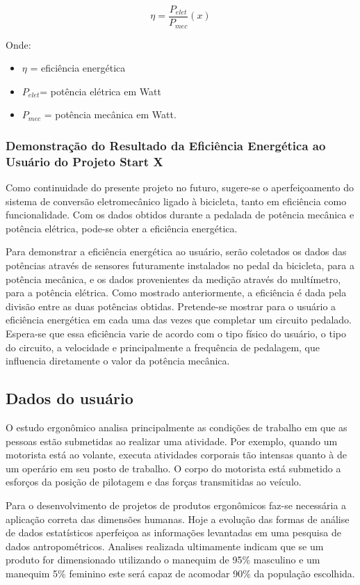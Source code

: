\begin{equation}
\eta =\frac{P_{elet}}{P_{mec}}\left ( x \right )
\label{eficiencia-energetica}
\end{equation}

Onde: 

\begin{itemize}

  \item $\eta$ = eficiência energética
  \item $P_{elet}$= potência elétrica em Watt
  \item $P_{mec} $ = potência mecânica em Watt.
\end{itemize}

\subsubsection{Demonstração do Resultado da Eficiência Energética ao Usuário do Projeto Start X}

Como continuidade do presente projeto no futuro, sugere-se o aperfeiçoamento do sistema de conversão eletromecânico ligado à bicicleta, tanto em eficiência como funcionalidade. Com os dados obtidos durante a pedalada de potência mecânica e potência elétrica, pode-se obter a eficiência energética. 

Para demonstrar a eficiência energética ao usuário, serão coletados os dados das potências através de sensores futuramente instalados no pedal da bicicleta, para a potência mecânica, e os dados provenientes da medição através do multímetro, para a potência elétrica. Como mostrado anteriormente, a eficiência é dada pela divisão entre as duas potências obtidas. Pretende-se mostrar para o usuário a eficiência energética em cada uma das vezes que completar um circuito pedalado. Espera-se que essa eficiência varie de acordo com o tipo físico do usuário, o tipo do circuito, a velocidade e principalmente a frequência de pedalagem, que influencia diretamente o valor da potência mecânica.

\subsection{Dados do usuário}

O estudo ergonômico analisa principalmente as condições de trabalho em que as pessoas estão submetidas ao realizar uma atividade. Por exemplo, quando um motorista está ao volante, executa atividades corporais tão intensas quanto à de um operário em seu posto de trabalho. O corpo do motorista está submetido a esforços da posição de pilotagem e das forças transmitidas ao veículo. 

Para o desenvolvimento de projetos de produtos ergonômicos faz-se necessária a aplicação correta das dimensões humanas. Hoje a evolução das formas de análise de dados estatísticos aperfeiçoa as informações levantadas em uma pesquisa de dados antropométricos. Analises realizada ultimamente indicam que se um produto for dimensionado utilizando o manequim de 95\%  masculino e um manequim 5\% feminino este será capaz de acomodar 90\% da população escolhida. 
